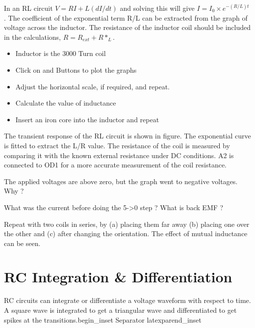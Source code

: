 \documentclass[a4paper,12pt,english]{sphinxmanual}
\begin{document}
In an RL circuit \(V = RI + L(dI/dt)\) and solving this will give
\(I = I_0 \times e^{- (R/L)t}\). The coefficient of the exponential term R/L
can be extracted from the graph of voltage across the inductor. The
resistance of the inductor coil should be included in the
calculations, \(R = R_{ext} + R*_L\).

\begin{itemize}
\item {} 
Inductor is the 3000 Turn coil

\item {} 
Click on  and  Buttons to plot the graphs

\item {} 
Adjust the horizontal scale, if required, and repeat.

\item {} 
Calculate the value of inductance

\item {} 
Insert an iron core into the inductor and repeat

\end{itemize}


The transient response of the RL circuit is shown in figure. The
exponential curve is fitted to extract the L/R value. The resistance of
the coil is measured by comparing it with the known external resistance
under DC conditions. A2 is connected to OD1 for a more accurate
measurement of the coil resistance.

The applied voltages are above zero, but the graph went to negative
voltages. Why ?

What was the current before doing the 5-\textgreater{}0 step ? What is back EMF ?

Repeat with two coils in series, by (a) placing them far away (b)
placing one over the other and (c) after changing the orientation. The
effect of mutual inductance can be seen.


\section{RC Integration \& Differentiation}
\label{\detokenize{4.6:rc-integration-differentiation}}\label{\detokenize{4.6::doc}}

RC circuits can integrate or differentiate a voltage waveform with
respect to time. A square wave is integrated to get a triangular wave
and differentiated to get spikes at the transitions.begin\_inset
Separator latexparend\_inset
\end{document}
